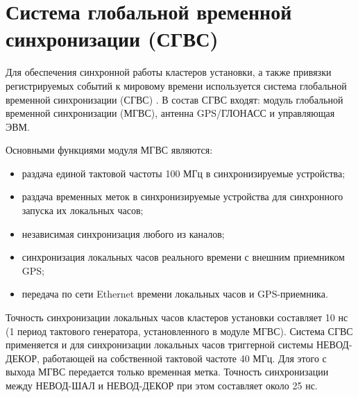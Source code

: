 \chapter*{Система глобальной временной синхронизации (СГВС)}
\label{ch:intro}

Для обеспечения синхронной работы кластеров установки, а также привязки регистрируемых событий к мировому времени используется система глобальной временной синхронизации (СГВС) \cite{amelchakov2022nevod}. В состав СГВС входят: модуль глобальной временной синхронизации (МГВС), антенна GPS/ГЛОНАСС и управляющая ЭВМ. 

Основными функциями модуля МГВС являются:
\begin{itemize}
    \item раздача единой тактовой частоты 100 МГц в синхронизируемые устройства;
    \item раздача временных меток в синхронизируемые устройства для синхронного запуска их локальных часов;
    \item независимая синхронизация любого из каналов;
    \item синхронизация локальных часов реального времени с внешним приемником GPS;
    \item передача по сети Ethernet времени локальных часов и GPS-приемника.
\end{itemize}

Точность синхронизации локальных часов кластеров установки составляет 10 нс (1 период тактового генератора, установленного в модуле МГВС). Система СГВС применяется и для синхронизации локальных часов триггерной системы НЕВОД-ДЕКОР, работающей на собственной тактовой частоте 40 МГц. Для этого с выхода МГВС передается только временная метка. Точность синхронизации между НЕВОД-ШАЛ и НЕВОД-ДЕКОР при этом составляет около 25 нс.




\endinput
